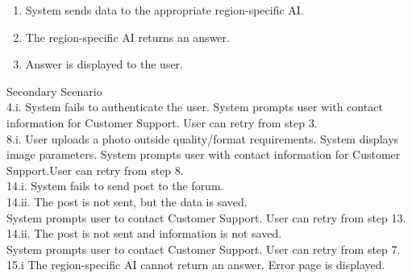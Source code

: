 \documentclass[]{article}
\begin{document}
\begin{enumerate}[{\bf BE1.}]
\begin{enumerate}[{1.}]
                    \item System sends data to the appropriate region-specific AI. 
                    \item The region-specific AI returns an answer. 
                    \item Answer is displayed to the user. \\
                \end{enumerate}
                    Secondary Scenario \\
                    4.i. System fails to authenticate the user. 
                    System prompts user with contact information for Customer Support. User can retry from step 3. \\
                    8.i. User uploads a photo outside quality/format requirements. System displays image parameters. System prompts user with contact information for Customer Support.User can retry from step 8. \\
                    14.i. System fails to send post to the forum. \\
	            14.ii. 	The post is not sent, but the data is saved. \\
                    System prompts user to contact Customer Support. User can retry from step 13. \\
	            14.ii. 	The post is not sent and information is not        saved.\\ 
                    System prompts user to contact Customer Support. User can retry from step 7. \\
                    15.i The region-specific AI cannot return an answer. Error page is displayed. \\


\end{enumerate}
\end{document}
